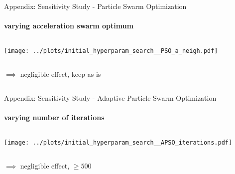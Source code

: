 \documentclass[11pt,aspectratio=169]{beamer}
\begin{document}
%
%

\begin{closingframe}{Appendix: Sensitivity Study - Particle Swarm Optimization}
    \framesubtitle{varying \textbf{acceleration swarm optimum}}

    \begin{columns}
    \begin{column}{0.8\textwidth}
        \texttt{[image: ../plots/initial\_hyperparam\_search\_\_PSO\_a\_neigh.pdf]}
    \end{column}
    \end{columns}

    \begin{columns}
        \begin{column}{0.8\textwidth}
            $\implies$ negligible effect, keep as is
        \end{column}
        \begin{column}{0.1\textwidth}
            \tiny{}
        \end{column}
    \end{columns}
\end{closingframe}

%
%
\begin{closingframe}{Appendix: Sensitivity Study - Adaptive Particle Swarm Optimization}
    \label{sec:sensitivity_study_apso_appendix}
    \framesubtitle{varying \textbf{number of iterations}}

    \begin{columns}
    \begin{column}{0.8\textwidth}
        \texttt{[image: ../plots/initial\_hyperparam\_search\_\_APSO\_iterations.pdf]}
    \end{column}
    \end{columns}

    \begin{columns}
        \begin{column}{0.8\textwidth}
            $\implies$ negligible effect, $\geq 500$
        \end{column}
        \begin{column}{0.1\textwidth}
            \tiny{}
        \end{column}
    \end{columns}
\end{closingframe}
\end{document}
